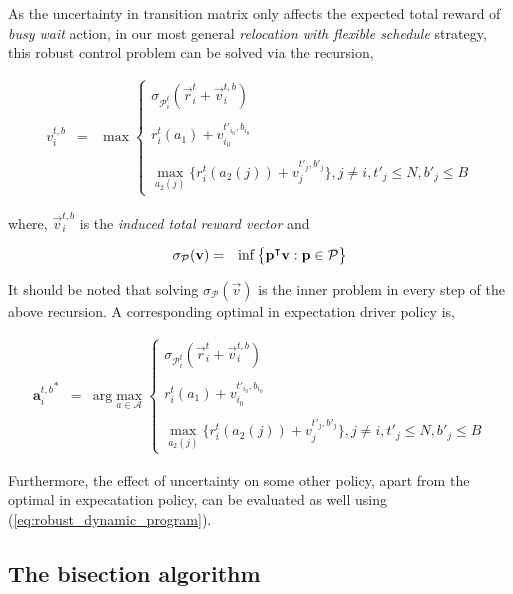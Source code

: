 As the uncertainty in transition matrix only affects the expected total reward of \textit{busy wait} action, in our most general \textit{relocation with flexible schedule} strategy, this robust control problem can be solved via the recursion,

\begin{eqnarray}
v_{i}^{t,b} &=& \max
    \begin{cases}
    \sigma_{\mathcal{P}_{i}^{t}}(\vec{r}_{i}^{t} + \vec{v}_{i}^{t,b})\\ \\
    r_{i}^{t}(a_1) + v_{i_0}^{t'_{i_0},b_{i_0}} \\ \\
    \max_{a_2(j)} \bigg\{r_{i}^{t}(a_2(j)) + v_{j}^{t'_{j},b'_{j}}\bigg\}, j \neq i, t'_{j} \leq N, b'_{j} \leq B
    \end{cases}
\label{eq:robust_dynamic_program}
\end{eqnarray}

where, $\vec{v}_{i}^{t,b}$ is the \textit{induced total reward vector} and 

\begin{eqnarray*}
\sigma_{\mathcal{P}}(\mathbf{v}) &=& \inf\big\{ \mathbf{p}^\intercal\mathbf{v}: \mathbf{p} \in \mathcal{P} \big\}
\end{eqnarray*}

It should be noted that solving $\sigma_{\mathcal{P}}(\vec{v})$ is the inner problem in every step of the above recursion. A corresponding optimal in expectation driver policy is,

\begin{eqnarray}
{\textbf{a}_{i}^{t,b}}^* &=& \textrm{arg}\max_{a \in \mathcal{A}}
    \begin{cases}
    \sigma_{\mathcal{P}_{i}^{t}}(\vec{r}_{i}^{t} + \vec{v}_{i}^{t,b})\\ \\
    r_{i}^{t}(a_1) + v_{i_0}^{t'_{i_0},b_{i_0}} \\ \\
    \max_{a_2(j)} \bigg\{r_{i}^{t}(a_2(j)) + v_{j}^{t'_{j},b'_{j}}\bigg\}, j \neq i, t'_{j} \leq N, b'_{j} \leq B
    \end{cases}
\end{eqnarray}

Furthermore, the effect of uncertainty on some other policy, apart from the optimal in expecatation policy, can be evaluated as well using (\ref{eq:robust_dynamic_program}).

\subsection{The bisection algorithm}


